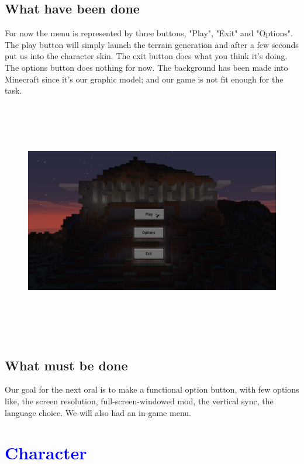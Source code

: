 \documentclass[article]{report} %
\begin{document}
			\section{What have been done}
				For now the menu is represented by three buttons, "Play", "Exit" and "Options". The play button will simply launch the terrain generation and after a few seconds put us into the character skin. The exit button does what you think it's doing. The options button does nothing for now. The background has been made into Minecraft since it's our graphic model; and our game is not fit enough for the task.
				\begin{figure}[h]
					\includegraphics[width=17cm, height=10.5cm]{images/Screenshot/GameMenu.png}
				\end{figure}
			\section{What must be done}
				Our goal for the next oral is to make a functional option button,  with few options like, the screen resolution, full-screen-windowed mod, the vertical sync, the language choice. We will also had an in-game menu.

		\chapter{\textcolor{blue}{Character}}
\end{document}

